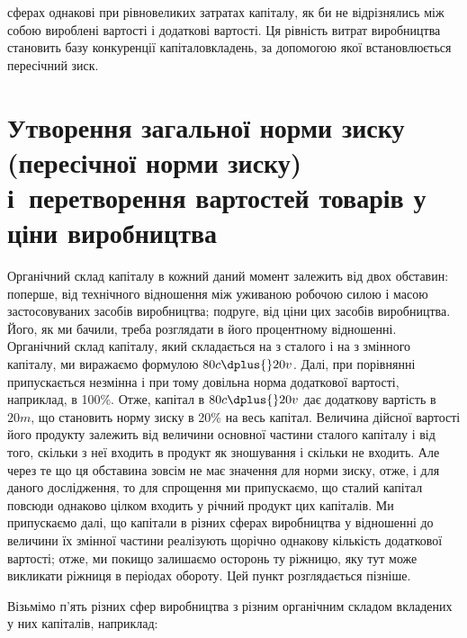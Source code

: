 \parcont{}  %
сферах однакові при рівновеликих затратах капіталу, як би не
відрізнялись між собою вироблені вартості і додаткові вартості.
Ця рівність витрат виробництва становить базу конкуренції капіталовкладень, за допомогою якої
встановлюється пересічний зиск.

\section{%
Утворення загальної норми зиску (пересічної норми зиску)
і~перетворення вартостей товарів у ціни виробництва}
%

Органічний склад капіталу в кожний даний момент залежить
від двох обставин: поперше, від технічного відношення між уживаною робочою силою і масою
застосовуваних засобів виробництва; подруге, від ціни цих засобів виробництва. Його, як ми бачили,
треба розглядати в його процентному відношенні. Органічний склад капіталу, який складається на  з
сталого і на  з змінного капіталу, ми виражаємо формулою $80 c \dplus{} 20 v$. Далі, при
порівнянні припускається незмінна і при тому довільна норма
додаткової вартості, наприклад, в 100\%. Отже, капітал в $80 c \dplus{} 20 v$ дає додаткову вартість в $20 m$,
що становить норму зиску
в 20\% на весь капітал. Величина дійсної вартості його продукту
залежить від величини основної частини сталого капіталу і від
того, скільки з неї входить в продукт як зношування і скільки
не входить. Але через те що ця обставина зовсім не має значення для норми зиску, отже, і для даного
дослідження, то для
спрощення ми припускаємо, що сталий капітал повсюди однаково цілком входить у річний продукт цих
капіталів. Ми припускаємо далі, що капітали в різних сферах виробництва у
відношенні до величини їх змінної частини реалізують щорічно
однакову кількість додаткової вартості; отже, ми покищо залишаємо осторонь ту ріжницю, яку тут може
викликати ріжниця
в періодах обороту. Цей пункт розглядається пізніше.

Візьмімо п’ять різних сфер виробництва з різним органічним
складом вкладених у них капіталів, наприклад:

